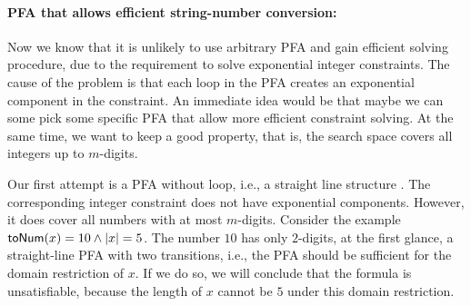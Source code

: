 \documentclass[sigplan,review,anonymous]{acmart}\settopmatter{printfolios=true,printccs=false,printacmref=false}
\begin{document}
\paragraph{PFA that allows efficient string-number conversion: } Now we know that it is unlikely to use arbitrary PFA and gain efficient solving procedure, due to the requirement to solve exponential integer constraints. The cause of the problem is that each loop in the PFA creates an exponential component in the constraint. An immediate idea would be that maybe we can some pick some specific PFA that allow more efficient constraint solving. At the same time, we want to keep a good property, that is, the search space covers all integers up to $m$-digits.

Our first attempt is a PFA without loop, i.e., a straight line structure 
. The corresponding integer constraint does not have exponential components. However, it does cover all numbers with at most $m$-digits. Consider the example $\mbox{\textsf{toNum}($x$)}=10 \wedge |x|=5$. The number $10$ has only $2$-digits, at the first glance, a straight-line PFA with two transitions, i.e., the PFA
   should be sufficient for the domain restriction of $x$. If we do so, we will conclude that the formula is unsatisfiable, because the length of $x$ cannot be $5$ under this domain restriction.
\end{document}
